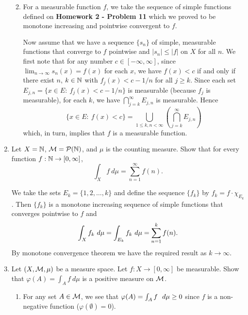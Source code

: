 \documentclass[12pt]{article}
\begin{document}
\begin{enumerate}
\begin{mybox}
\begin{enumerate}
            \vspace*{3mm}
            \item For a measurable function $f$, we take the sequence of
            simple functions defined on \textbf{Homework 2 - Problem 11}
            which we proved to be monotone increasing and pointwise
            convergent to $f$.

            \vspace*{2mm}
            Now assume that we have a sequence $\{s_n\}$ of simple,
            measurable functions that converge to $f$ pointwise
            and $|s_n|\leq|f|$ on $X$ for all $n$. We first note that
            for any number $c\in[-\infty,\infty]$,
            since $\lim_{n\to\infty}{s_n(x)}=f(x)$ for each $x$, we have
            $f(x)<c$ if and only if there exist $n$, $k\in\mathbb{N}$ with
            $f_j(x)<c-1/n$ for all $j\geq k$. Since each set $E_{j,n}
            =\{x\in E:\ f_j(x)<c-1/n\}$ is measurable (because $f_j$ is
            measurable), for each $k$, we have $\bigcap_{j=k}^\infty
            {E_{j,n}}$ is measurable. Hence
            $$\{x\in E:\ f(x)<c\}=\bigcup_{1\leq k,n<\infty}\left(
            \bigcap_{j=k}^\infty{E_{j,n}}\right)$$
            which, in turn, implies that $f$ is a measurable
            function.
        \end{enumerate}
    \end{mybox}
    \item Let $X = \mathbb{N}$, $\mathcal{M} = \mathcal{P}(\mathbb{N})$, and $\mu$ is the counting measure. Show that for every function $f: \mathbb{N} \to [0, \infty]$, 
    $$ \int_X f \ d\mu = \sum_{n=1}^{\infty} f(n).$$
    
    \begin{mybox}
        We take the sets $E_k=\{1,2,\ldots,k\}$ and define the sequence
        $\{f_k\}$ by $f_k=f\cdot\chi_{E_k}$. Then $\{f_k\}$ is a monotone
        increasing sequence of simple functions
        that converges pointwise to $f$ and
        $$\int_X{f_k\ d\mu}=\int_{E_k}{f_k\ d\mu}=\sum_{n=1}^{k}{f(n)}.$$
        By monotone convergence theorem we have the required result as
        $k\longrightarrow \infty$.
    \end{mybox}

    \item Let $(X, \mathcal{M}, \mu)$ be a measure space. Let $f: X  \to [0, \infty]$ be measurable. Show that $\varphi(A) = \int_A f \ d\mu$ is a positive measure on $\mathcal{M}$.
    
    \begin{mybox}
        \begin{enumerate}
            \item For any set $A\in\mathcal{M}$, we see that $\varphi(A)=\int_A
            {f\ \ d\mu}\geq 0$ since $f$ is a non-negative function
            ($\varphi(\emptyset)=0$).


\end{enumerate}
\end{mybox}
\end{enumerate}
\end{document}
